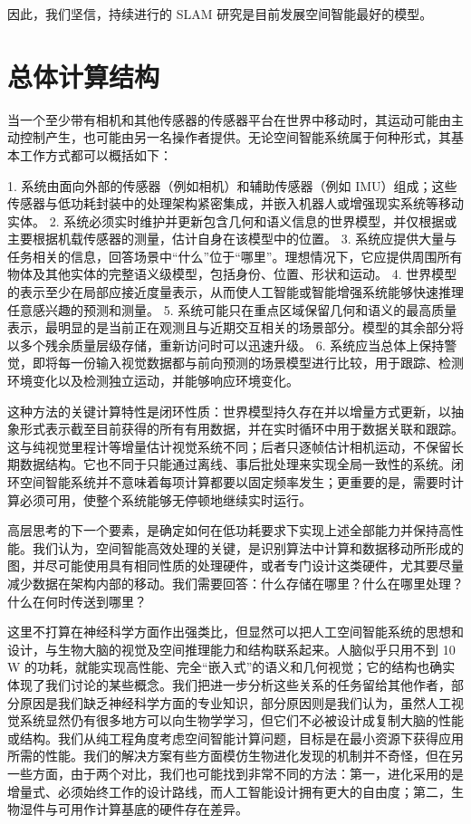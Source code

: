 因此，我们坚信，持续进行的 SLAM 研究是目前发展空间智能最好的模型。

\section{总体计算结构}

当一个至少带有相机和其他传感器的传感器平台在世界中移动时，其运动可能由主动控制产生，也可能由另一名操作者提供。无论空间智能系统属于何种形式，其基本工作方式都可以概括如下：

1. 系统由面向外部的传感器（例如相机）和辅助传感器（例如 IMU）组成；这些传感器与低功耗封装中的处理架构紧密集成，并嵌入机器人或增强现实系统等移动实体。
2. 系统必须实时维护并更新包含几何和语义信息的世界模型，并仅根据或主要根据机载传感器的测量，估计自身在该模型中的位置。
3. 系统应提供大量与任务相关的信息，回答场景中“什么”位于“哪里”。理想情况下，它应提供周围所有物体及其他实体的完整语义级模型，包括身份、位置、形状和运动。
4. 世界模型的表示至少在局部应接近度量表示，从而使人工智能或智能增强系统能够快速推理任意感兴趣的预测和测量。
5. 系统可能只在重点区域保留几何和语义的最高质量表示，最明显的是当前正在观测且与近期交互相关的场景部分。模型的其余部分将以多个残余质量层级存储，重新访问时可以迅速升级。
6. 系统应当总体上保持警觉，即将每一份输入视觉数据都与前向预测的场景模型进行比较，用于跟踪、检测环境变化以及检测独立运动，并能够响应环境变化。

这种方法的关键计算特性是闭环性质：世界模型持久存在并以增量方式更新，以抽象形式表示截至目前获得的所有有用数据，并在实时循环中用于数据关联和跟踪。这与纯视觉里程计等增量估计视觉系统不同；后者只逐帧估计相机运动，不保留长期数据结构。它也不同于只能通过离线、事后批处理来实现全局一致性的系统。闭环空间智能系统并不意味着每项计算都要以固定频率发生；更重要的是，需要时计算必须可用，使整个系统能够无停顿地继续实时运行。

高层思考的下一个要素，是确定如何在低功耗要求下实现上述全部能力并保持高性能。我们认为，空间智能高效处理的关键，是识别算法中计算和数据移动所形成的图，并尽可能使用具有相同性质的处理硬件，或者专门设计这类硬件，尤其要尽量减少数据在架构内部的移动。我们需要回答：什么存储在哪里？什么在哪里处理？什么在何时传送到哪里？

这里不打算在神经科学方面作出强类比，但显然可以把人工空间智能系统的思想和设计，与生物大脑的视觉及空间推理能力和结构联系起来。人脑似乎只用不到 10 W 的功耗，就能实现高性能、完全“嵌入式”的语义和几何视觉；它的结构也确实体现了我们讨论的某些概念。我们把进一步分析这些关系的任务留给其他作者，部分原因是我们缺乏神经科学方面的专业知识，部分原因则是我们认为，虽然人工视觉系统显然仍有很多地方可以向生物学学习，但它们不必被设计成复制大脑的性能或结构。我们从纯工程角度考虑空间智能计算问题，目标是在最小资源下获得应用所需的性能。我们的解决方案有些方面模仿生物进化发现的机制并不奇怪，但在另一些方面，由于两个对比，我们也可能找到非常不同的方法：第一，进化采用的是增量式、必须始终工作的设计路线，而人工智能设计拥有更大的自由度；第二，生物湿件与可用作计算基底的硬件存在差异。


